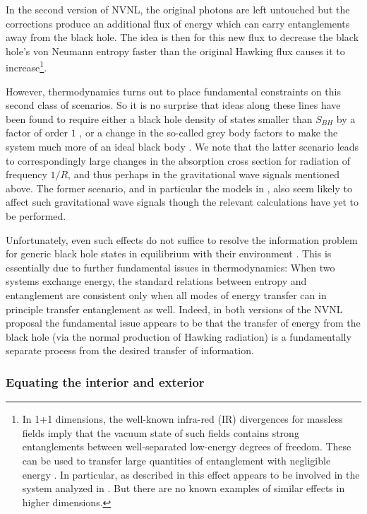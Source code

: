 \documentclass[12pt]{article}
\begin{document}
In the second version of NVNL, the original photons are left untouched but the corrections produce an additional flux of energy which can carry entanglements away from the black hole.  The idea is then for this new flux to decrease the black hole's von Neumann entropy faster than the original Hawking flux causes it to increase\footnote{In 1+1 dimensions, the well-known infra-red (IR) divergences for massless fields imply that the vacuum state of such fields contains strong entanglements between well-separated low-energy degrees of freedom.  These can be used to transfer large quantities of entanglement with negligible energy \cite{Wilczek1992,Hotta:2015yla}. In particular, as described in \cite{Almheiri:2013wka} this effect appears to be involved in the system analyzed in \cite{Ashtekar:2008jd,Ashtekar:2010hx,Ashtekar:2010qz}. But there are no known examples of similar effects in higher dimensions.  }.

However, thermodynamics turns out to place fundamental constraints \cite{Almheiri:2013hfa} on this second class of scenarios.  So it is no surprise that ideas along these lines have been found to require either a black hole density of states smaller than $S_{BH}$ by a factor of order $1$ \cite{Giddings:2013vda}, or a change in the so-called grey body factors to make the system much more of an ideal black body \cite{Giddings:2015uzr}.  We note that the latter scenario leads to correspondingly large changes in the absorption cross section for radiation of frequency $1/R$, and thus perhaps in the gravitational wave signals mentioned above.  The former scenario, and in particular the models in \cite{Giddings:2017mym}, also seem likely to affect such gravitational wave signals though the relevant calculations have yet to be performed.

Unfortunately, even such effects do not suffice to resolve the information problem for generic black hole states in equilibrium with their environment \cite{Almheiri:2013hfa}.  This is essentially due to further fundamental issues in thermodynamics:  When two systems exchange energy, the standard relations between entropy and entanglement are consistent only when all modes of energy transfer can in principle transfer entanglement as well. Indeed, in both versions of the NVNL proposal the fundamental issue appears to be that the transfer of energy from the black hole (via the normal production of Hawking radiation) is a fundamentally separate process from the desired transfer of information.

\subsubsection{Equating the interior and exterior}
\end{document}
